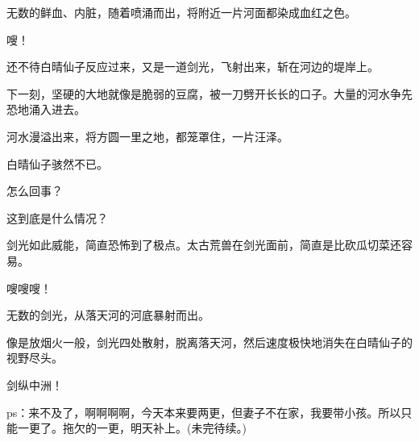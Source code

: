 \begin{this_body}
无数的鲜血、内脏，随着喷涌而出，将附近一片河面都染成血红之色。

嗖！

还不待白晴仙子反应过来，又是一道剑光，飞射出来，斩在河边的堤岸上。

下一刻，坚硬的大地就像是脆弱的豆腐，被一刀劈开长长的口子。大量的河水争先恐地涌入进去。

河水漫溢出来，将方圆一里之地，都笼罩住，一片汪泽。

白晴仙子骇然不已。

怎么回事？

这到底是什么情况？

剑光如此威能，简直恐怖到了极点。太古荒兽在剑光面前，简直是比砍瓜切菜还容易。

嗖嗖嗖！

无数的剑光，从落天河的河底暴射而出。

像是放烟火一般，剑光四处散射，脱离落天河，然后速度极快地消失在白晴仙子的视野尽头。

剑纵中洲！

ps：来不及了，啊啊啊啊，今天本来要两更，但妻子不在家，我要带小孩。所以只能一更了。拖欠的一更，明天补上。(未完待续。)

\end{this_body}

